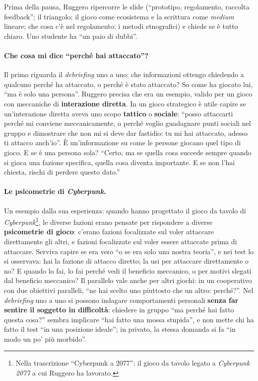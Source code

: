 Prima della pausa, Ruggero ripercorre le slide (``prototipo, regolamento, raccolta
feedback''; il triangolo; il gioco come ecosistema e la scrittura come \emph{medium}
lineare; che cosa c'è nel regolamento; i metodi etnografici) e chiede se è tutto chiaro.
Uno studente ha ``un paio di dubbi''.

\paragraph{Che cosa mi dice ``perché hai attaccato''?} Il primo riguarda il
\emph{debriefing} uno a uno: che informazioni ottengo chiedendo a qualcuno perché ha
attaccato, o perché è stato attaccato? So come ha giocato lui, ``ma è solo una
persona''. Ruggero precisa che era un esempio, valido per un gioco con meccaniche di
\textbf{interazione diretta}. In un gioco strategico è utile capire se un'interazione
diretta aveva uno scopo \textbf{tattico} o \textbf{sociale}: ``posso attaccarti perché mi
conviene meccanicamente, o perché voglio guadagnare punti sociali nel gruppo e dimostrare
che non mi si deve dar fastidio: tu mi hai attaccato, adesso ti attacco anch'io''. È
un'informazione su come le persone giocano quel tipo di gioco. E se è una persona sola?
``Certo, ma se quella cosa succede sempre quando si gioca una fazione specifica, quella
cosa diventa importante. E se non l'hai chiesta, rischi di perdere questo dato.''

\paragraph{Le psicometrie di \emph{Cyberpunk}.} Un esempio dalla sua esperienza: quando
hanno progettato il gioco da tavolo di \emph{Cyberpunk}\footnote{Nella trascrizione
``Cyberpunk a 2077'': il gioco da tavolo legato a \emph{Cyberpunk 2077} a cui Ruggero ha
lavorato.}, le diverse fazioni erano pensate per rispondere a diverse
\textbf{psicometrie di gioco}: c'erano fazioni focalizzate sul voler attaccare
direttamente gli altri, e fazioni focalizzate sul voler essere attaccate prima di
attaccare. Serviva capire se era vero ``o se era solo una nostra teoria'', e nei test lo
si osservava: hai la fazione di attacco diretto; la usi per attaccare direttamente o no?
E quando lo fai, lo fai perché vedi il beneficio meccanico, o per motivi slegati dal
beneficio meccanico? Il parallelo vale anche per altri giochi: in un cooperativo con due
obiettivi paralleli, ``ne hai scelto uno piuttosto che un altro: perché?''. Nel
\emph{debriefing} uno a uno si possono indagare comportamenti personali \textbf{senza far
sentire il soggetto in difficoltà}: chiedere in gruppo ``ma perché hai fatto questa
cosa?'' sembra implicare ``hai fatto una mossa stupida'', e non mette chi ha fatto il test
``in una posizione ideale''; in privato, la stessa domanda si fa ``in modo un po' più
morbido''.

